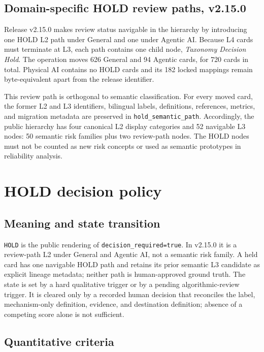 \documentclass[11pt,a4paper]{article}
\newcommand{\code}[1]{\texttt{#1}}
\begin{document}
\subsection{Domain-specific HOLD review paths, v2.15.0}

Release v2.15.0 makes review status navigable in the hierarchy by introducing
one HOLD L2 path under General and one under Agentic AI. Because L4 cards must
terminate at L3, each path contains one child node, \textit{Taxonomy Decision
Hold}. The operation moves 626 General and 94 Agentic cards, for 720 cards in
total. Physical AI contains no HOLD cards and its 182 locked mappings remain
byte-equivalent apart from the release identifier.

This review path is orthogonal to semantic classification. For every moved
card, the former L2 and L3 identifiers, bilingual labels, definitions,
references, metrics, and migration metadata are preserved in
\code{hold\_semantic\_path}. Accordingly, the public hierarchy has four
canonical L2 display categories and 52 navigable L3 nodes: 50 semantic risk
families plus two review-path nodes. The HOLD nodes must not be counted as new
risk concepts or used as semantic prototypes in reliability analysis.

\section{HOLD decision policy}

\subsection{Meaning and state transition}

\code{HOLD} is the public rendering of \code{decision\_required=true}. In
v2.15.0 it is a review-path L2 under General and Agentic AI, not a semantic risk
family. A held card has one navigable HOLD path and retains its prior semantic
L3 candidate as explicit lineage metadata; neither path is human-approved
ground truth. The state is set by a hard qualitative
trigger or by a pending algorithmic-review trigger. It is cleared only by a
recorded human decision that reconciles the label, mechanism-only definition,
evidence, and destination definition; absence of a competing score alone is
not sufficient.

\subsection{Quantitative criteria}
\end{document}

